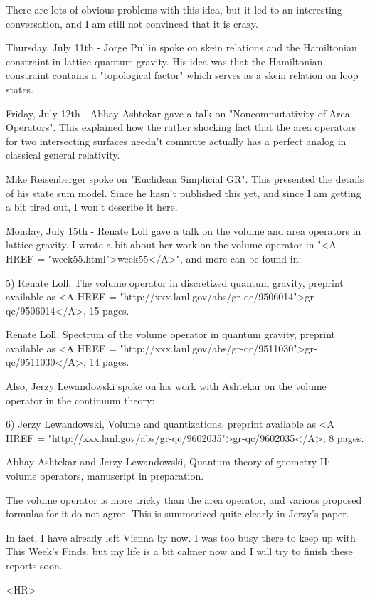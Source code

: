 There are lots of obvious problems with this idea, but it led to an
interesting conversation, and I am still not convinced that it is
crazy.  

Thursday, July 11th - Jorge Pullin spoke on skein relations and
the Hamiltonian constraint in lattice quantum gravity.  His idea
was that the Hamiltonian constraint contains a "topological factor"
which serves as a skein relation on loop states.  

Friday, July 12th - Abhay Ashtekar gave a talk on "Noncommutativity
of Area Operators".  This explained how the rather shocking fact that
the area operators for two intersecting surfaces needn't commute actually 
has a perfect analog in classical general relativity.  

Mike Reisenberger spoke on "Euclidean Simplicial GR".  This presented
the details of his state sum model.  Since he hasn't published this
yet, and since I am getting a bit tired out, I won't describe it here.

Monday, July 15th - Renate Loll gave a talk on the volume and area
operators in lattice gravity.  I wrote a bit about her work on the
volume operator in "<A HREF = "week55.html">week55</A>", and more can be found in:
  
5) Renate Loll, The volume operator in discretized quantum gravity,
preprint available as <A HREF = "http://xxx.lanl.gov/abs/gr-qc/9506014">gr-qc/9506014</A>, 15 pages.  

Renate Loll, Spectrum of the volume operator in quantum gravity, 
preprint available as <A HREF = "http://xxx.lanl.gov/abs/gr-qc/9511030">gr-qc/9511030</A>, 14 pages. 

Also, Jerzy Lewandowski spoke on his work with Ashtekar on
the volume operator in the continuum theory:

6) Jerzy Lewandowski, Volume and quantizations, preprint available
as <A HREF = "http://xxx.lanl.gov/abs/gr-qc/9602035">gr-qc/9602035</A>, 8 pages.  

Abhay Ashtekar and Jerzy Lewandowski, Quantum theory of geometry II: 
volume operators, manuscript in preparation.

The volume operator is more tricky than the area operator, and various
proposed formulas for it do not agree.  This is summarized quite
clearly in Jerzy's paper.

In fact, I have already left Vienna by now.  I was too busy there
to keep up with This Week's Finds, but my life is a bit calmer now
and I will try to finish these reports soon.


<HR>



